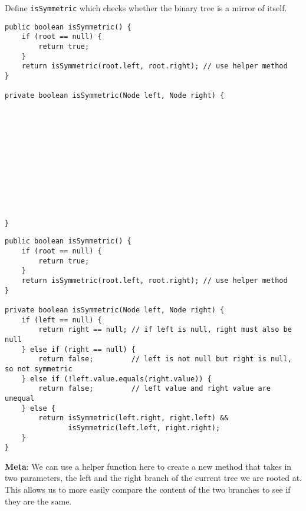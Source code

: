 \begin{blocksection}
\question Define \lstinline$isSymmetric$ which checks whether the binary tree
is a mirror of itself.

\ifprintanswers\else
\begin{lstlisting}
public boolean isSymmetric() {
    if (root == null) {
        return true;
    }
    return isSymmetric(root.left, root.right); // use helper method
}

private boolean isSymmetric(Node left, Node right) {












}
\end{lstlisting}
\fi

\begin{solution}
\begin{lstlisting}
public boolean isSymmetric() {
    if (root == null) {
        return true;
    }
    return isSymmetric(root.left, root.right); // use helper method
}

private boolean isSymmetric(Node left, Node right) {
    if (left == null) {
        return right == null; // if left is null, right must also be null
    } else if (right == null) {
        return false;         // left is not null but right is null, so not symmetric
    } else if (!left.value.equals(right.value)) {
        return false;         // left value and right value are unequal
    } else {
        return isSymmetric(left.right, right.left) &&
               isSymmetric(left.left, right.right);
    }
}
\end{lstlisting}

\textbf{Meta}: We can use a helper function here to create a new method that
takes in two parameters, the left and the right branch of the current tree we
are rooted at.  This allows us to more easily compare the content of the two
branches to see if they are the same.
\end{solution}
\end{blocksection}
